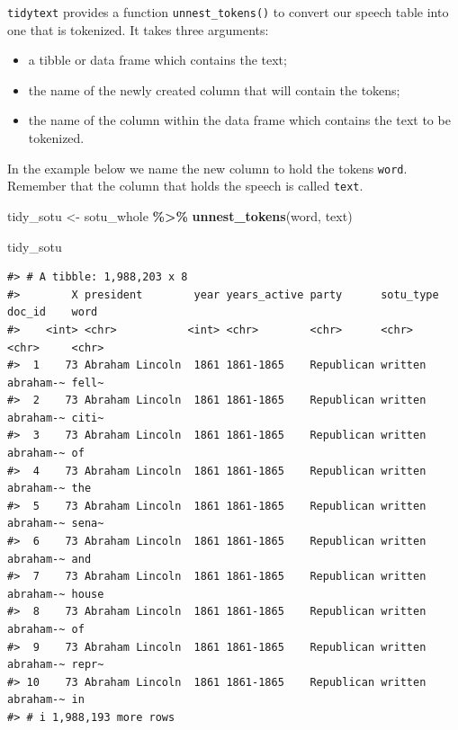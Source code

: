 \documentclass[
]{book}
\newenvironment{Shaded}{\begin{snugshade}}{\end{snugshade}}
\newcommand{\FunctionTok}[1]{\textcolor[rgb]{0.13,0.29,0.53}{\textbf{#1}}}
\newcommand{\NormalTok}[1]{#1}
\newcommand{\OtherTok}[1]{\textcolor[rgb]{0.56,0.35,0.01}{#1}}
\newcommand{\SpecialCharTok}[1]{\textcolor[rgb]{0.81,0.36,0.00}{\textbf{#1}}}
\providecommand{\tightlist}{%
  \setlength{\itemsep}{0pt}\setlength{\parskip}{0pt}}
\begin{document}
\texttt{tidytext} provides a function \texttt{unnest\_tokens()} to convert our speech table into one that is tokenized. It takes three arguments:

\begin{itemize}
\tightlist
\item
  a tibble or data frame which contains the text;
\item
  the name of the newly created column that will contain the tokens;
\item
  the name of the column within the data frame which contains the text to be tokenized.
\end{itemize}

In the example below we name the new column to hold the tokens \texttt{word}. Remember that the column that holds the speech is called \texttt{text}.

\begin{Shaded}
\begin{Highlighting}[]
\NormalTok{tidy\_sotu }\OtherTok{\textless{}{-}}\NormalTok{ sotu\_whole }\SpecialCharTok{\%\textgreater{}\%}
  \FunctionTok{unnest\_tokens}\NormalTok{(word, text)}

\NormalTok{tidy\_sotu}
\end{Highlighting}
\end{Shaded}

\begin{verbatim}
#> # A tibble: 1,988,203 x 8
#>        X president        year years_active party      sotu_type doc_id    word 
#>    <int> <chr>           <int> <chr>        <chr>      <chr>     <chr>     <chr>
#>  1    73 Abraham Lincoln  1861 1861-1865    Republican written   abraham-~ fell~
#>  2    73 Abraham Lincoln  1861 1861-1865    Republican written   abraham-~ citi~
#>  3    73 Abraham Lincoln  1861 1861-1865    Republican written   abraham-~ of   
#>  4    73 Abraham Lincoln  1861 1861-1865    Republican written   abraham-~ the  
#>  5    73 Abraham Lincoln  1861 1861-1865    Republican written   abraham-~ sena~
#>  6    73 Abraham Lincoln  1861 1861-1865    Republican written   abraham-~ and  
#>  7    73 Abraham Lincoln  1861 1861-1865    Republican written   abraham-~ house
#>  8    73 Abraham Lincoln  1861 1861-1865    Republican written   abraham-~ of   
#>  9    73 Abraham Lincoln  1861 1861-1865    Republican written   abraham-~ repr~
#> 10    73 Abraham Lincoln  1861 1861-1865    Republican written   abraham-~ in   
#> # i 1,988,193 more rows
\end{verbatim}
\end{document}
